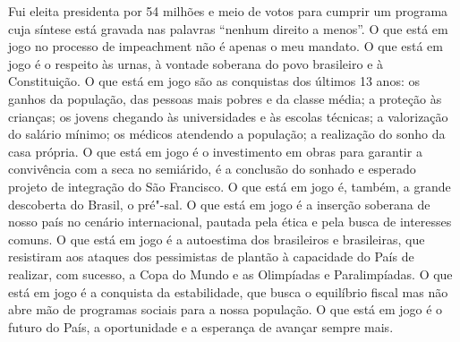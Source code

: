 Fui eleita presidenta por 54 milhões e meio de votos para cumprir um
programa cuja síntese está gravada nas palavras ``nenhum direito a
menos''. O que está em jogo no processo de impeachment não é apenas o
meu mandato. O que está em jogo é o respeito às urnas, à vontade
soberana do povo brasileiro e à Constituição. O que está em jogo são as
conquistas dos últimos 13 anos: os ganhos da população, das pessoas mais
pobres e da classe média; a proteção às crianças; os jovens chegando às
universidades e às escolas técnicas; a valorização do salário mínimo; os
médicos atendendo a população; a realização do sonho da casa própria. O
que está em jogo é o investimento em obras para garantir a convivência
com a seca no semiárido, é a conclusão do sonhado e esperado projeto de
integração do São Francisco. O que está em jogo é, também, a grande
descoberta do Brasil, o pré"-sal. O que está em jogo é a inserção
soberana de nosso país no cenário internacional, pautada pela ética e
pela busca de interesses comuns. O que está em jogo é a autoestima dos
brasileiros e brasileiras, que resistiram aos ataques dos pessimistas de
plantão à capacidade do País de realizar, com sucesso, a Copa do Mundo e
as Olimpíadas e Paralimpíadas. O que está em jogo é a conquista da
estabilidade, que busca o equilíbrio fiscal mas não abre mão de
programas sociais para a nossa população. O que está em jogo é o futuro
do País, a oportunidade e a esperança de avançar sempre mais.

